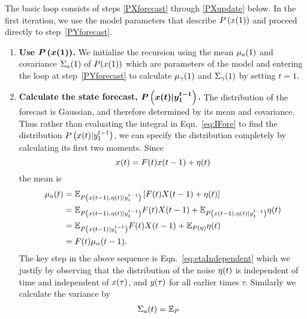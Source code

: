 The basic loop consists of steps \ref{PXforecast} through
\ref{PXupdate} below.  In the first iteration, we use the model
parameters that describe $P\left({x}{(1)} \right)$ and proceed
directly to step~\ref{PYforecast}.
\begin{enumerate}
\item \label{PX1} \textbf{Use $\bm{P\left({x}{(1)} \right)}$.}  We
  initialize the recursion using the mean ${\mu_a}{(1)}$ and
  covariance ${\Sigma_a}{(1)}$ of $P({x}{(1)})$ which are parameters
  of the model and entering the loop at step~\ref{PYforecast} to
  calculate ${\mu_\gamma}{(1)}$ and ${\Sigma_\gamma}{(1)}$ by
  setting $t=1$.
\item \label{PXforecast} \textbf{Calculate the state forecast,
    $\bm{P\left({x}{(t)}|y_{1}^{t-1} \right)}$.}  The distribution
  of the forecast is Gaussian, and therefore determined by its mean
  and covariance.  Thus rather than evaluating the integral in
  Eqn.~\eqref{eq:IFore} to find the distribution
  $P\left({x}{(t)}|y_{1}^{t-1} \right)$, we can specify the
  distribution completely by calculating its first two moments.  Since
  \begin{equation*}
    {x}{(t)} = {F}{(t)} {x}{(t-1)} + {\eta}{(t)}
  \end{equation*}
  the mean is
  \begin{align}
    {\mu_a}{(t)} &= \mathbb{E}_{P
      \left({x}{(t-1)},{\eta}{(t)}|y_{1}^{t-1} \right)} \left[
      {F}{(t)}{X}{(t-1)} + {\eta}{(t)} \right] \nonumber \\
    &= \mathbb{E}_{P\left({x}{(t-1)},{\eta}{(t)}|y_{1}^{t-1} \right)}
      {F}{(t)}{X}{(t-1)} +
      \mathbb{E}_{P\left({x}{(t-1)},{\eta}{(t)}|y_{1}^{t-1} \right)} {\eta}{(t)} \nonumber \\
    \label{eq:etaIndependent}
    &= \mathbb{E}_{P \left({x}{(t-1)}|y_{1}^{t-1} \right)}
    {F}{(t)}{X}{(t-1)}  + \mathbb{E}_{P (\eta)} {\eta}{(t)} \\
     &= {F}{(t)}{\mu_\alpha}{(t-1)}. \nonumber
   \end{align}
   The key step in the above sequence is
   Eqn.~\eqref{eq:etaIndependent} which we justify by observing that
   the distribution of the noise ${\eta}{(t)}$ is independent of time
   and independent of ${x}{(\tau)}$, and ${y}{(\tau)}$ for all
   earlier times $\tau$.  Similarly we calculate the
   variance by
   \begin{align}
     {\Sigma_a}{(t)} &= \mathbb{E}_{P
}
\end{align}
\end{enumerate}
